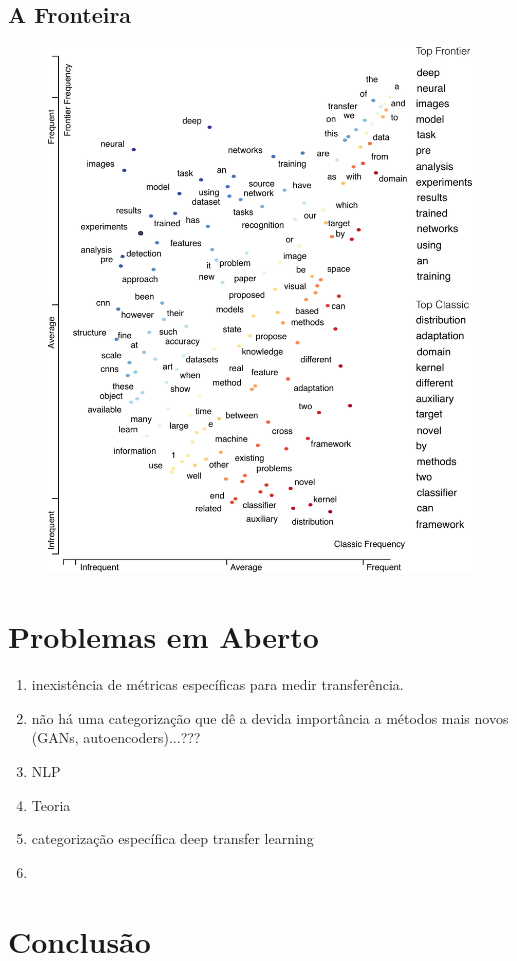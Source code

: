 \documentclass[sigconf]{acmart}
\begin{document}
  \subsection{A Fronteira}\label{fronteira}
  \lipsum[2]
  \begin{figure}
    \includegraphics[width=\columnwidth]{frontier3.pdf}
    \caption{} \label{fig:scatterText}
  \end{figure}

\section{Problemas em Aberto}
\begin{enumerate}
  \item inexistência de métricas específicas para medir transferência.
  \item não há uma categorização que dê a devida importância a métodos mais novos (GANs, autoencoders)...???
  \item NLP
  \item Teoria
  \item categorização específica deep transfer learning
  \item 
\end{enumerate}
\lipsum[3]
\section{Conclusão}
\lipsum[3]


\end{document}
